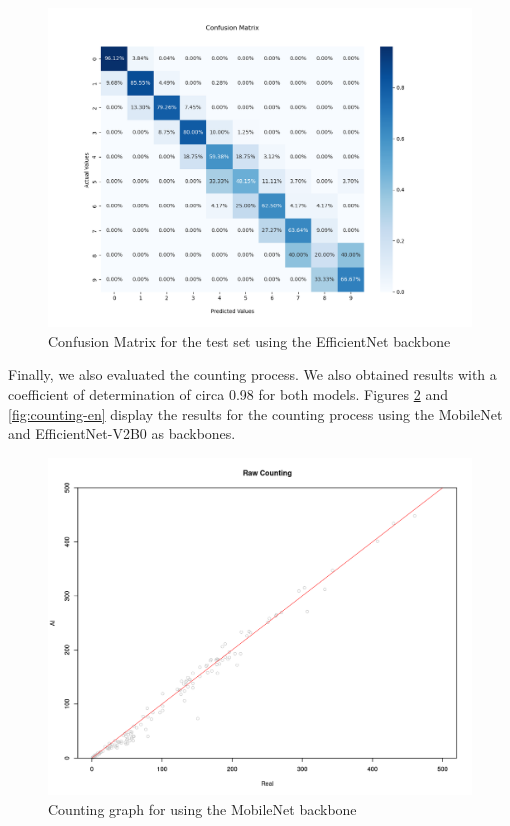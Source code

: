 \begin{figure}[h!]
    \centering
    \includegraphics[width = .9\linewidth]{Figures/data_aug_val_en.png}
    \caption{Confusion Matrix for the test set using the EfficientNet backbone}
    \label{fig:aug-tst-en}
\end{figure}

Finally, we also evaluated the counting process. We also obtained results with a coefficient of determination of circa 0.98 for both models. Figures \ref{fig:counting-mn} and \ref{fig:counting-en} display the results for the counting process using the MobileNet and EfficientNet-V2B0 as backbones.

\begin{figure}[h!]
    \centering
    \includegraphics[width = .8\linewidth]{Figures/counting_aug_mn.png}
    \caption{Counting graph for using the MobileNet backbone}
    \label{fig:counting-mn}
\end{figure}

